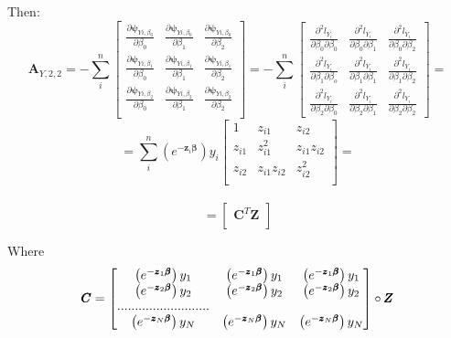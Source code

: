 \documentclass[]{article}
\begin{document}
Then:
  \[
  \pmb{A}_{Y,2,2} = -\sum_i^n\begin{bmatrix}
      \frac{\partial \pmb{\psi}_{Yi,\beta_0}}{ \partial \beta_0} &
      \frac{\partial \pmb{\psi}_{Yi,\beta_0}}{ \partial \beta_1} &
      \frac{\partial \pmb{\psi}_{Yi,\beta_0}}{ \partial \beta_2} \\
      \frac{\partial \pmb{\psi}_{Yi,\beta_1}}{ \partial \beta_0} &
      \frac{\partial \pmb{\psi}_{Yi,\beta_1}}{ \partial \beta_1} &
      \frac{\partial \pmb{\psi}_{Yi,\beta_1}}{ \partial \beta_2} \\
      \frac{\partial \pmb{\psi}_{Yi,\beta_2}}{ \partial \beta_0} &
      \frac{\partial \pmb{\psi}_{Yi,\beta_2}}{ \partial \beta_1} &
      \frac{\partial \pmb{\psi}_{Yi,\beta_2}}{ \partial \beta_2}\\
  \end{bmatrix}
   =-\sum_i^n\begin{bmatrix}
      \frac{\partial^2 l_{Y_i}}{ \partial \beta_0\partial \beta_0}  & \frac{\partial^2 l_{Y_i}}{ \partial \beta_0\partial \beta_1} & \frac{\partial^2 l_{Y_i}}{ \partial \beta_0\partial \beta_2} \\
      \frac{\partial^2 l_{Y_i}}{ \partial \beta_1\partial \beta_o}  & \frac{\partial^2 l_{Y_i}}{ \partial \beta_1\partial \beta_1} & \frac{\partial^2 l_{Y_i}}{ \partial \beta_1\partial \beta_2}\\
      \frac{\partial^2 l_{Y_i}}{ \partial \beta_2\partial \beta_0}  & \frac{\partial^2 l_{Y_i}}{ \partial \beta_2\partial \beta_1} & \frac{\partial^2 l_{Y_i}}{ \partial \beta_2\partial \beta_2}
  \end{bmatrix} =
  \]
  \[
    =\sum_i^n  \left(e^{-\pmb{z}_i \pmb{\beta}}\right)y_i
  \begin{bmatrix}
      1   &  z_{i1}   & z_{i2}   \\
      z_{i1}   &  z_{i1}^2   & z_{i1}z_{i2} \\
      z_{i2}   &  z_{i1}z_{i2}   & z_{i2}^2  \\
  \end{bmatrix}=\]\\
  \[
  =
  \begin{bmatrix}
      \pmb{C}^T\pmb{Z} \\
  \end{bmatrix} 
  \]
  
  Where
  \[
  \pmb{C} = 
  \begin{bmatrix}
      \left(e^{-\pmb{z}_1 \pmb{\beta}}\right)y_1   &  \left(e^{-\pmb{z}_1 \pmb{\beta}}\right)y_1  & \left(e^{-\pmb{z}_1 \pmb{\beta}}\right)y_1 \\
      \left(e^{-\pmb{z}_2 \pmb{\beta}}\right)y_2   &  \left(e^{-\pmb{z}_2 \pmb{\beta}}\right)y_2  & \left(e^{-\pmb{z}_2 \pmb{\beta}}\right)y_2 \\
       .......................... \\
      \left(e^{-\pmb{z}_N \pmb{\beta}}\right)y_N   &  \left(e^{-\pmb{z}_N \pmb{\beta}}\right)y_N  & \left(e^{-\pmb{z}_N \pmb{\beta}}\right)y_N \\
  \end{bmatrix} 
    \circ \pmb{Z} \\
  \]
\end{document}
